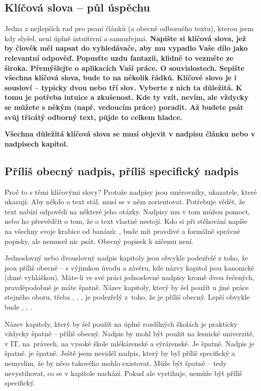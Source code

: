 \subsection*{Klíčová slova -- půl úspěchu}
Jedna z nejlepších rad pro psaní článků (a obecně odborného textu), kterou jsem kdy slyšel, není úplně intuitivní a samozřejmá.
\bf Napište si klíčová slova, jež by člověk měl napsat do vyhledávače, aby mu vypadlo Vaše dílo jako relevantní odpověď. \rm
Popusťte uzdu fantazii, klidně to vezměte ze široka. Přemýšlejte o aplikacích Vaší práce. O souvislostech. Sepište všechna klíčová slova, bude to na několik řádků. Klíčové slovo je i sousloví -- typicky dvou nebo tří slov. Vyberte z nich ta důležitá. K tomu je potřeba intuice a zkušenost. Kde ty vzít, nevím, ale vždycky se můžete s někým (např. vedoucím práce) poradit. Až budete psát svůj třicátý odborný text, půjde to celkem hladce.

\bf Všechna důležitá klíčová slova se musí objevit v nadpisu článku nebo v nadpisech kapitol. \rm

\subsection*{Příliš obecný nadpis, příliš specifický nadpis}
Proč to s těmi klíčovými slovy? Protože nadpisy jsou směrovníky, ukazatele, které ukazují:  Aby někdo o text stál, musí se v něm zorientovat. Potřebuje vědět, že text nabízí odpovědi na některé jeho otázky. Nadpisy mu v tom můžou pomoct, nebo ho přesvědčit o tom, že o text vlastně nestojí. Kdo si při stěhování napíše na všechny svoje krabice od banánů: , bude mít pravdivé a formálně správné popisky, ale nemusel nic psát. Obecný popisek k ničemu není.

Jednoslovný nebo dvouslovný nadpis kapitoly jsou obvykle podezřelé z toho, že jsou příliš obecné -- s výjimkou úvodu a závěru, kde názvy kapitol jsou kanonické (dané vyhláškou). Máte-li ve své práci jednoslovné nadpisy kromě dvou řečených, pravděpodobně je máte špatně. Název kapitoly, který by šel použít u jiné práce stejného oboru, třeba , , , je podezřelý z~toho, že je příliš obecný. Lepší obvykle bude , , .

Název kapitoly, který by šel použít na úplně rozdílných školách je prakticky vždycky špatně -- příliš obecný. Nadpis  by mohl být použit na lesnické univerzitě, v IT, na~právech, na vysoké škole mlékárenské a sýrárenské. Je špatně. Nadpis  je špatně.  je špatně. Ještě jsem neviděl nadpis, který by byl příliš specifický a nemyslím, že by něco takového mohlo existovat. Může být špatně -- tedy nevystihovat, co se v kapitole nachází. Pokud ale vystihuje, nemůže být příliš specifický.

